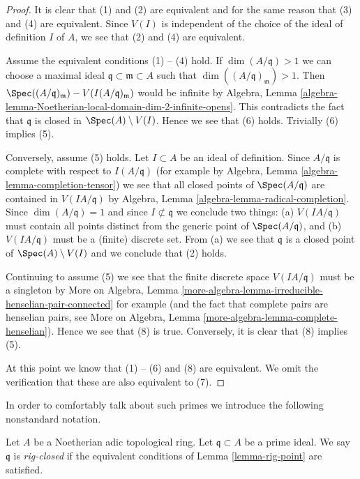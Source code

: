 \begin{proof}
It is clear that (1) and (2) are equivalent and for the same reason
that (3) and (4) are equivalent.
Since $V(I)$ is independent of the choice of the ideal of definition
$I$ of $A$, we see that (2) and (4) are equivalent.

\medskip\noindent
Assume the equivalent conditions (1) -- (4) hold.
If $\dim(A/\mathfrak q) > 1$ we can choose a maximal
ideal $\mathfrak q \subset \mathfrak m \subset A$
such that $\dim((A/\mathfrak q)_\mathfrak m) > 1$.
Then $\Spec((A/\mathfrak q)_\mathfrak m) - V(I(A/\mathfrak q)_\mathfrak m)$
would be infinite by Algebra, Lemma
\ref{algebra-lemma-Noetherian-local-domain-dim-2-infinite-opens}.
This contradicts the fact that $\mathfrak q$ is closed in
$\Spec(A) \setminus V(I)$.
Hence we see that (6) holds. Trivially (6) implies (5).

\medskip\noindent
Conversely, assume (5) holds. Let $I \subset A$ be an ideal of definition.
Since $A/\mathfrak q$ is complete
with respect to $I(A/\mathfrak q)$ (for example by
Algebra, Lemma \ref{algebra-lemma-completion-tensor})
we see that all closed points of $\Spec(A/\mathfrak q)$ are
contained in $V(IA/\mathfrak q)$ by
Algebra, Lemma \ref{algebra-lemma-radical-completion}.
Since $\dim(A/\mathfrak q) = 1$ and since $I \not \subset \mathfrak q$
we conclude two things: (a) $V(IA/\mathfrak q)$ must contain
all points distinct from the generic point of $\Spec(A/\mathfrak q)$, and
(b) $V(IA/\mathfrak q)$ must be a (finite) discrete set.
From (a) we see that $\mathfrak q$ is a closed point of
$\Spec(A) \setminus V(I)$ and we conclude that (2) holds.

\medskip\noindent
Continuing to assume (5) we see that the finite discrete space
$V(IA/\mathfrak q)$ must be a singleton by More on Algebra, Lemma
\ref{more-algebra-lemma-irreducible-henselian-pair-connected}
for example (and the fact that complete pairs are henselian pairs, see
More on Algebra, Lemma \ref{more-algebra-lemma-complete-henselian}).
Hence we see that (8) is true.
Conversely, it is clear that (8) implies (5).

\medskip\noindent
At this point we know that (1) -- (6) and (8) are equivalent.
We omit the verification that these are also equivalent to (7).
\end{proof}

\noindent
In order to comfortably talk about such primes we introduce
the following nonstandard notation.

\begin{definition}
\label{definition-rig-closed}
Let $A$ be a Noetherian adic topological ring. Let
$\mathfrak q \subset A$ be a prime ideal. We say
$\mathfrak q$ is {\it rig-closed} if the equivalent
conditions of Lemma \ref{lemma-rig-point} are satisfied.
\end{definition}

